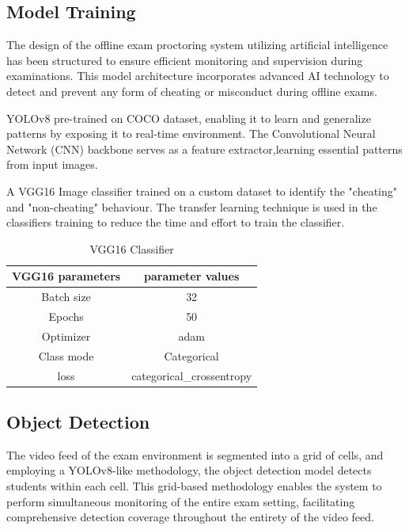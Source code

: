 \documentclass[conference]{IEEEtran}
\begin{document}
\subsection{Model Training}
The design of the offline exam proctoring system utilizing artificial intelligence has been structured to ensure efficient monitoring and supervision during examinations. This model architecture incorporates advanced AI technology to detect and prevent any form of cheating or misconduct during offline exams.

YOLOv8 pre-trained on COCO dataset, enabling it to learn and generalize patterns by exposing it to real-time environment. The Convolutional Neural Network (CNN) backbone serves as a feature extractor,learning essential patterns from input images.

A VGG16 Image classifier trained on a custom dataset to identify the "cheating" and "non-cheating" behaviour. The transfer learning technique is used in the classifiers training to reduce the time and effort to train the classifier.
\begin{table}[htbp]
\caption{VGG16 Classifier}
\label{tab2} %
\begin{center}
\begin{tabular}{|c|c|}
\hline
\textbf{VGG16 parameters} & \textbf{parameter values} \\ %
\hline
Batch size & 32 \\ %
\hline
Epochs& 50 \\
\hline
Optimizer& adam\\
\hline
Class mode& Categorical\\
\hline
loss & categorical\_crossentropy \\

\hline
\end{tabular}
\end{center}
\end{table}





\subsection{Object Detection}
The video feed of the exam environment is segmented into a grid of cells, and employing a YOLOv8-like methodology, the object detection model detects students within each cell. This grid-based methodology enables the system to perform simultaneous monitoring of the entire exam setting, facilitating comprehensive detection coverage throughout the entirety of the video feed.
\end{document}
